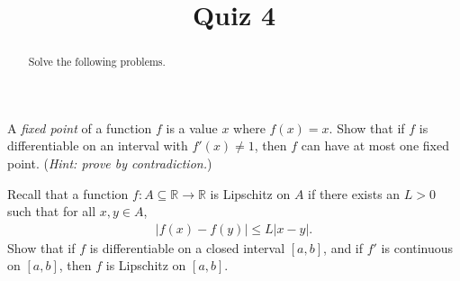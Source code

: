 \documentclass{ximera}
\begin{document}
    \title{Quiz 4}
    \begin{abstract} Solve the following problems. \end{abstract}
    \maketitle
\begin{exercise}
A \textit{fixed point} of a function $f$ is a value $x$ where $f(x) = x$.  Show that if $f$ is differentiable on an interval with $f'(x) \neq 1$, then $f$ can have at most one fixed point.  (\textit{Hint: prove by contradiction.})
\end{exercise} 
\newpage

\begin{exercise}
    Recall that a function $f:A \subseteq \mathbb{R}\to \mathbb{R}$ is Lipschitz on $A$ if there exists an $L> 0$ such that for all $x,y \in A$,
    \begin{align*}
        \left| f(x)- f(y)\right| \leq L|x-y|.
    \end{align*}
    Show that if $f$ is differentiable on a closed interval $[a,b]$, and if $f'$ is continuous on $[a,b]$, then $f$ is Lipschitz on $[a,b]$.
 \end{exercise}
\end{document}
